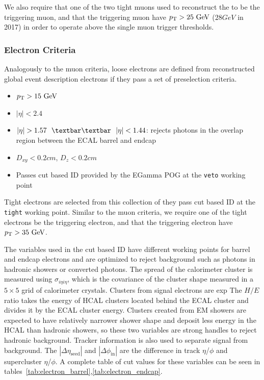 We also require that one of the two tight muons used to reconstruct the \VZ to be the triggering muon, and that the triggering muon have $\pt>25\unit{GeV}$ ($28\unit{GeV}$ in 2017) in order to operate above the single muon trigger thresholds.

\subsubsection{Electron Criteria} \label{sec:ana_electrons}
Analogously to the muon criteria, loose electrons are defined from reconstructed global event description electrons if they pass a set of preselection criteria. 
\begin{itemize}
	\item $\pt>15\unit{GeV}$
	\item $|\eta|<2.4$
	\item $|\eta|>1.57\ \ \textbar\textbar\ \ |\eta|<1.44$: rejects photons in the overlap region between the ECAL barrel and endcap
	\item $D_{xy}<0.2\unit{cm}$, $D_{z}<0.2\unit{cm}$
	\item Passes cut based ID provided by the EGamma POG at the \texttt{veto} working point
\end{itemize}
Tight electrons are selected from this collection of they pass cut based ID at the \texttt{tight} working point. Similar to the muon criteria, we require one of the tight electrons be the triggering electron, and that the triggering electron have $\pt>35\unit{GeV}$.

The variables used in the cut based ID have different working points for barrel and endcap electrons and are optimized to reject background such as photons in hadronic showers or converted photons. The spread of the calorimeter cluster is measured using $\sigma_{i\eta i\eta}$, which is the covariance of the cluster shape measured in a $5\times5$ grid of calorimeter crystals. Clusters from signal electrons are exp The $H/E$ ratio takes the energy of HCAL clusters located behind the ECAL cluster and divides it by the ECAL cluster energy. Clusters created from EM showers are expected to have relatively narrower shower shape and deposit less energy in the HCAL than hadronic showers, so these two variables are strong handles to reject hadronic background. Tracker information is also used to separate signal from background. The $|\Delta\eta_\text{seed}|$ and $|\Delta\phi_\text{in}|$ are the difference in track $\eta$/$\phi$ and supercluster $\eta$/$\phi$. A complete table of cut values for these variables can be seen in tables~\ref{tab:electron_barrel},\ref{tab:electron_endcap}. 

